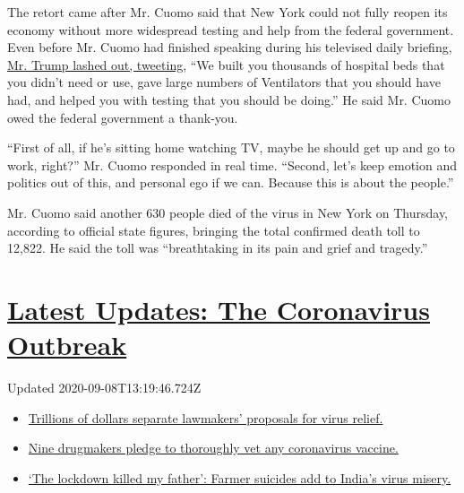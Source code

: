 The retort came after Mr. Cuomo said that New York could not fully
reopen its economy without more widespread testing and help from the
federal government. Even before Mr. Cuomo had finished speaking during
his televised daily briefing,
\href{https://twitter.com/realDonaldTrump/status/1251181563506757632?s=20}{Mr.
Trump lashed out, tweeting}, ``We built you thousands of hospital beds
that you didn't need or use, gave large numbers of Ventilators that you
should have had, and helped you with testing that you should be doing.''
He said Mr. Cuomo owed the federal government a thank-you.

``First of all, if he's sitting home watching TV, maybe he should get up
and go to work, right?'' Mr. Cuomo responded in real time. ``Second,
let's keep emotion and politics out of this, and personal ego if we can.
Because this is about the people.''

Mr. Cuomo said another 630 people died of the virus in New York on
Thursday, according to official state figures, bringing the total
confirmed death toll to 12,822. He said the toll was ``breathtaking in
its pain and grief and tragedy.''

\hypertarget{latest-updates-the-coronavirus-outbreak}{%
\section{\texorpdfstring{\href{https://www.nytimes3xbfgragh.onion/2020/09/08/world/covid-19-coronavirus.html?action=click\&pgtype=Article\&state=default\&region=MAIN_CONTENT_1\&context=storylines_live_updates}{Latest
Updates: The Coronavirus
Outbreak}}{Latest Updates: The Coronavirus Outbreak}}\label{latest-updates-the-coronavirus-outbreak}}

Updated 2020-09-08T13:19:46.724Z

\begin{itemize}
\tightlist
\item
  \href{https://www.nytimes3xbfgragh.onion/2020/09/08/world/covid-19-coronavirus.html?action=click\&pgtype=Article\&state=default\&region=MAIN_CONTENT_1\&context=storylines_live_updates\#link-46162376}{Trillions
  of dollars separate lawmakers' proposals for virus relief.}
\item
  \href{https://www.nytimes3xbfgragh.onion/2020/09/08/world/covid-19-coronavirus.html?action=click\&pgtype=Article\&state=default\&region=MAIN_CONTENT_1\&context=storylines_live_updates\#link-679303d7}{Nine
  drugmakers pledge to thoroughly vet any coronavirus vaccine.}
\item
  \href{https://www.nytimes3xbfgragh.onion/2020/09/08/world/covid-19-coronavirus.html?action=click\&pgtype=Article\&state=default\&region=MAIN_CONTENT_1\&context=storylines_live_updates\#link-1c973131}{`The
  lockdown killed my father': Farmer suicides add to India's virus
  misery.}
\end{itemize}

